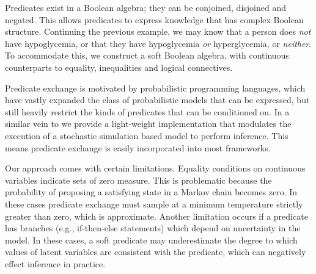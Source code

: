 Predicates exist in a Boolean algebra; they can be conjoined, disjoined and negated.
This allows predicates to express knowledge that has complex Boolean structure.
Continuing the previous example, we may know that a person does \emph{not} have hypoglycemia, or that they have hypoglycemia \emph{or} hyperglycemia, or \emph{neither}.
To accommodate this, we construct a soft Boolean algebra, with continuous counterparts to equality, inequalities and logical connectives.





Predicate exchange is motivated by probabilistic programming languages, which have vastly expanded the class of probabilistic models that can be expressed, but still heavily restrict the kinds of predicates that can be conditioned on.
In a similar vein to  \cite{wingate2011lightweight} we provide a light-weight implementation that modulates the execution of a stochastic simulation based model to perform inference.
This means predicate exchange is easily incorporated into most frameworks. 

Our approach comes with certain limitations.
Equality conditions on continuous variables indicate sets of zero measure.
This is problematic because the probability of proposing a satisfying state in a Markov chain becomes zero.
In these cases predicate exchange must sample at a minimum temperature strictly greater than zero, which is approximate.
Another limitation occurs if a predicate has branches (e.g., if-then-else statements) which depend on uncertainty in the model.
In these cases, a soft predicate may underestimate the degree to which values of latent variables are consistent with the predicate, which can negatively effect inference in practice.

